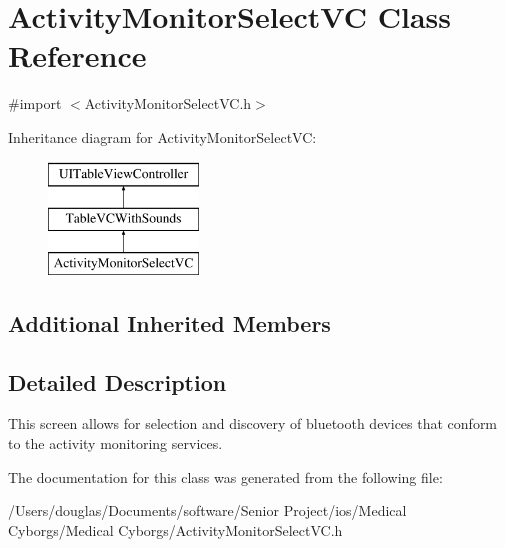 \hypertarget{interface_activity_monitor_select_v_c}{\section{Activity\-Monitor\-Select\-V\-C Class Reference}
\label{interface_activity_monitor_select_v_c}
}


{\ttfamily \#import $<$Activity\-Monitor\-Select\-V\-C.\-h$>$}

Inheritance diagram for Activity\-Monitor\-Select\-V\-C\-:\begin{figure}[H]
\begin{center}
\leavevmode
\includegraphics[height=3.000000cm]{interface_activity_monitor_select_v_c}
\end{center}
\end{figure}
\subsection*{Additional Inherited Members}


\subsection{Detailed Description}
This screen allows for selection and discovery of bluetooth devices that conform to the activity monitoring services. 

The documentation for this class was generated from the following file\-:\begin{DoxyCompactItemize}
\item 
/\-Users/douglas/\-Documents/software/\-Senior Project/ios/\-Medical Cyborgs/\-Medical Cyborgs/Activity\-Monitor\-Select\-V\-C.\-h\end{DoxyCompactItemize}
